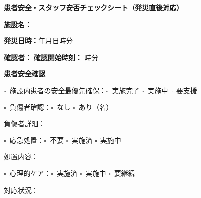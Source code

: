 \documentclass[a4paper,12pt]{jarticle}
\newcommand{\checkbox}{$\square$\ }
\newcommand{\underlinespace}[1]{\underline{\hspace{#1}}}
\begin{document}
\begin{center}
{\Large\textbf{患者安全・スタッフ安否チェックシート（発災直後対応）}}
\end{center}
\vspace{5mm}

\noindent
\textbf{施設名：} \underlinespace{8cm}

\vspace{3mm}

\noindent
\textbf{発災日時：}\underlinespace{2cm}年\underlinespace{1cm}月\underlinespace{1cm}日\underlinespace{1cm}時\underlinespace{1cm}分

\vspace{3mm}

\noindent
\textbf{確認者：} \underlinespace{4cm} \quad \textbf{確認開始時刻：} \underlinespace{1cm}時\underlinespace{1cm}分

\vspace{8mm}

\begin{center}
\textbf{\large 患者安全確認}
\end{center}

\vspace{3mm}

\noindent
\checkbox 施設内患者の安全最優先確保：\checkbox 実施完了 \quad \checkbox 実施中 \quad \checkbox 要支援

\vspace{3mm}

\noindent
\checkbox 負傷者確認：\checkbox なし \quad \checkbox あり（\underlinespace{1cm}名）

\vspace{2mm}

\noindent
負傷者詳細：\underlinespace{10cm}

\vspace{3mm}

\noindent
\checkbox 応急処置：\checkbox 不要 \quad \checkbox 実施済 \quad \checkbox 実施中

\vspace{2mm}

\noindent
処置内容：\underlinespace{10cm}

\vspace{3mm}

\noindent
\checkbox 心理的ケア：\checkbox 実施済 \quad \checkbox 実施中 \quad \checkbox 要継続

\vspace{2mm}

\noindent
対応状況：\underlinespace{10cm}
\end{document}
